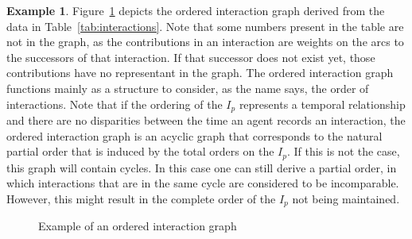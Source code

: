 \documentclass[a4paper,11pt]{book}
\theoremstyle{definition}
\newtheorem*{example}{Example}
\begin{document}
\begin{example}

    Figure~\ref{fig:ex_oig} depicts the ordered interaction graph derived from the data in Table~\ref{tab:interactions}.
    Note that some numbers present in the table are not in the graph, as the contributions in an interaction are
    weights on the arcs to the successors of that interaction. If that successor does not exist yet, those
    contributions have no representant in the graph. The ordered interaction graph functions mainly as a 
    structure to consider, as the name says, the order of interactions. Note that if the ordering of the $I_p$ represents
    a temporal relationship and there are no disparities between the time an agent records an interaction, 
    the ordered interaction graph is an acyclic graph that corresponds to the natural partial order that
    is induced by the total orders on the $I_p$. If this is not the case, this graph will contain cycles.
    In this case one can still derive a partial order, in which interactions that are in the same cycle
    are considered to be incomparable. However, this might result in the complete order of the $I_p$
    not being maintained.

    \begin{figure}[h]
        \centering
         \caption{Example of an ordered interaction graph}
         \label{fig:ex_oig}
    \end{figure}

\end{example}
\end{document}
